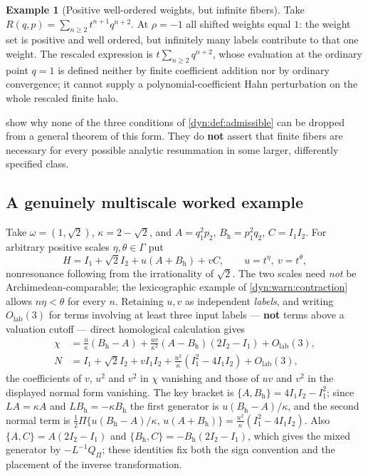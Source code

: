 \documentclass[11pt,letterpaper]{article}
\theoremstyle{definition}
\newtheorem{example}[example]{Example}
\theoremstyle{remark}
\numberwithin{equation}{section}
\begin{document}
\begin{example}[Positive well-ordered weights, but infinite fibers]
\label{dyn:ex:badfiber}
Take $R(q,p)=\sum_{n\ge2}t^{n+1}q^{n+2}$. At $\rho=-1$ all shifted weights
equal $1$: the weight set is positive and well ordered, but infinitely many
labels contribute to that one weight. The rescaled expression is
$t\sum_{n\ge2}q^{n+2}$, whose evaluation at the ordinary point $q=1$ is
defined neither by finite coefficient addition nor by ordinary convergence;
it cannot supply a polynomial-coefficient Hahn perturbation on the whole
rescaled finite halo.
\end{example}

 show why none of the three
conditions of \cref{dyn:def:admissible} can be dropped from a general
theorem of this form. They do \textbf{not} assert that finite fibers are
necessary for every possible analytic resummation in some larger,
differently specified class.

\subsection{A genuinely multiscale worked example}
\label{dyn:subsec:multiscale}

Take $\omega=(1,\sqrt2)$, $\kappa=2-\sqrt2$, and
$A=q_1^{2}p_2$, $B_{\mathrm h}=p_1^{2}q_2$, $C=I_1I_2$. For arbitrary
positive scales $\eta,\theta\in\Gamma$ put
\begin{equation}\label{dyn:eq:workedH}
 H=I_1+\sqrt2I_2+u(A+B_{\mathrm h})+vC,\qquad u=t^{\eta},\ v=t^{\theta},
\end{equation}
nonresonance following from the irrationality of $\sqrt2$. The two scales
need \emph{not} be Archimedean-comparable; the lexicographic example of
\cref{dyn:warn:contraction} allows $n\eta<\theta$ for every $n$. Retaining
$u,v$ as independent \emph{labels}, and writing $O_{\mathrm{lab}}(3)$ for
terms involving at least three input labels --- \textbf{not} terms above a
valuation cutoff --- direct homological calculation gives
\begin{align}
 \chi&=\frac{u}{\kappa}(B_{\mathrm h}-A)
 +\frac{uv}{\kappa^{2}}(A-B_{\mathrm h})(2I_2-I_1)+O_{\mathrm{lab}}(3),
 \label{dyn:eq:workedchi}\\
 N&=I_1+\sqrt2I_2+vI_1I_2
 +\frac{u^{2}}{\kappa}(I_1^{2}-4I_1I_2)+O_{\mathrm{lab}}(3),
 \label{dyn:eq:workedN}
\end{align}
the coefficients of $v$, $u^{2}$ and $v^{2}$ in $\chi$ vanishing and those
of $uv$ and $v^{2}$ in the displayed normal form vanishing. The key bracket
is $\{A,B_{\mathrm h}\}=4I_1I_2-I_1^{2}$; since $LA=\kappa A$ and
$LB_{\mathrm h}=-\kappa B_{\mathrm h}$ the first generator is
$u(B_{\mathrm h}-A)/\kappa$, and the second normal term is
$\frac12\Pi\{u(B_{\mathrm h}-A)/\kappa,\,u(A+B_{\mathrm h})\}
=\frac{u^{2}}{\kappa}(I_1^{2}-4I_1I_2)$. Also
$\{A,C\}=A(2I_2-I_1)$ and $\{B_{\mathrm h},C\}=-B_{\mathrm h}(2I_2-I_1)$,
which gives the mixed generator by $-L^{-1}Q_\Pi$; these identities fix
both the sign convention and the placement of the inverse transformation.
\end{document}
